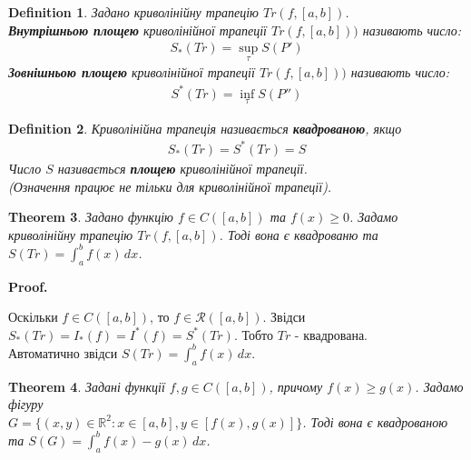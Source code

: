 \documentclass[a4paper, 10pt]{article}
\makeatletter
\def\huge{\displaystyle}
\def\qed{$\blacksquare$}
\theoremstyle{theoremdd}
\newtheorem{theorem}{Theorem}[subsection]
\theoremstyle{theoremdd}
\theoremstyle{theoremdd}
\newtheorem{definition}[theorem]{Definition}
\theoremstyle{theoremdd}
\theoremstyle{theoremdd}
\theoremstyle{theoremdd}
\theoremstyle{theoremdd}
\theoremstyle{theoremdd}
\theoremstyle{theoremdd}
\renewenvironment{proof}[1][Proof.\\]{\par
\pushQED{\hfill \qed}%
\normalfont \topsep6\p@\@plus6\p@\relax
\trivlist
\item\relax
{\bfseries
#1\@addpunct{.}}\hspace\labelsep\ignorespaces
}{%
\popQED\endtrivlist\@endpefalse
}
\makeatother
\begin{document}
\begin{definition} Задано криволінійну трапецію $Tr(f,[a,b])$.\\
\textbf{Внутрішньою площею} криволінійної трапеції $Tr(f,[a,b]))$ називають число:
\begin{align*}
S_*(Tr) = \huge\sup_{\tau} S(P')
\end{align*}
\textbf{Зовнішньою площею} криволінійної трапеції $Tr(f,[a,b]))$ називають число:
\begin{align*}
S^*(Tr) = \huge\inf_{\tau} S(P'')
\end{align*}
\end{definition}

\begin{definition}
Криволінійна трапеція називається \textbf{квадрованою}, якщо
\begin{align*}
S_*(Tr) = S^*(Tr) = S
\end{align*}
Число $S$ називається \textbf{площею} криволінійної трапеції.\\ (Означення працює не тільки для криволінійної трапеції).
\end{definition}

\begin{theorem}
Задано функцію $f \in C([a,b])$ та $f(x) \geq 0$. Задамо криволінійну трапецію $Tr(f,[a,b])$. Тоді вона є квадрованю та $S(Tr) = \huge\int_a^b f(x)\,dx$.
\end{theorem}

\begin{proof}
Оскільки $f \in C([a,b])$, то $f \in \mathcal{R}([a,b])$. Звідси $S_*(Tr) = I_*(f) = I^*(f) = S^*(Tr)$. Тобто $Tr$ - квадрована.\\
Автоматично звідси $S(Tr) = \huge\int_a^b f(x)\,dx$.
\end{proof}

\begin{theorem}
Задані функції $f,g \in C([a,b])$, причому $f(x) \geq g(x)$. Задамо фігуру \\ $G = \{(x,y) \in \mathbb{R}^2: x \in [a,b], y \in [f(x),g(x)]\}$. Тоді вона є квадрованою та $S(G) = \huge\int_a^b f(x)-g(x)\,dx$.\\
\end{theorem}
\end{document}
